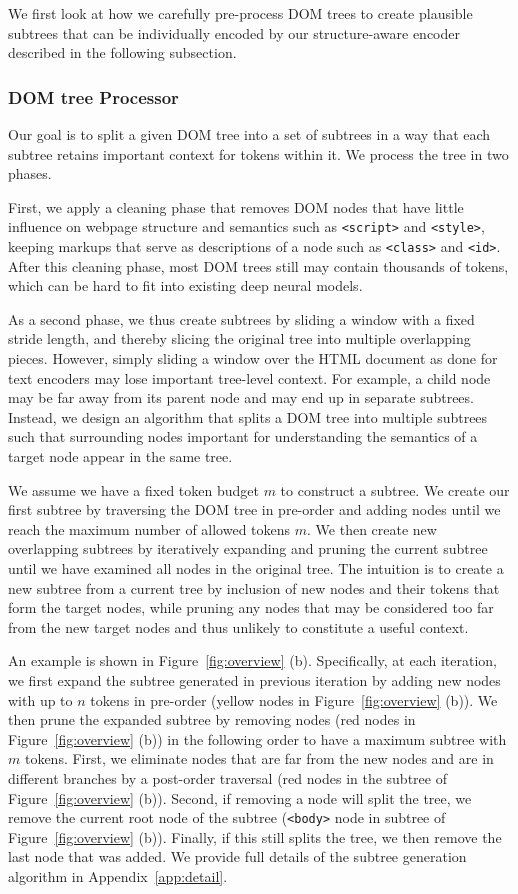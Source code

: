 \documentclass[sigconf, nonacm]{acmart}
\newcommand*\circled[1]{\tikz[baseline=(char.base)]{
            \node[shape=circle,draw,inner sep=1pt] (char) {#1};}}
\newcommand{\nop}[1]{}
\begin{document}
We first look at how we carefully pre-process DOM trees to create plausible subtrees that can be individually encoded by our structure-aware encoder described in the following subsection.
\subsubsection{DOM tree Processor}

Our goal is to split a given DOM tree into a set of subtrees in a way that each subtree retains important context for tokens within it. We process the tree in two phases. 

First, we apply a cleaning phase that removes DOM nodes that have little influence on webpage structure and semantics such as \texttt{<script>} and \texttt{<style>}, keeping markups that serve as descriptions of a node such as \texttt{<class>} and \texttt{<id>}. After this cleaning phase, most DOM trees still may contain thousands of tokens, which can be hard to fit into existing deep neural models. 

As a second phase, we thus create subtrees by sliding a window with a fixed stride length, and thereby slicing the original tree into multiple overlapping pieces. However, simply sliding a window over the HTML document as done for text encoders may lose important tree-level context. For example, a child node may be far away from its parent node and may end up in separate subtrees. Instead, we design an algorithm that splits a DOM tree into multiple subtrees such that surrounding nodes important for understanding the semantics of a target node appear in the same tree.

We assume we have a fixed token budget $m$ to construct a subtree. We create our first subtree by traversing the DOM tree in pre-order and adding nodes\nop{with a stride length of $n$} until we reach the maximum number of allowed tokens $m$. We then create new overlapping subtrees by iteratively expanding and pruning the current subtree until we have examined all nodes in the original tree. The intuition is to create a new subtree from a current tree by inclusion of new nodes and their tokens that form the target nodes, while pruning any nodes that may be considered too far from the new target nodes and thus unlikely to constitute a useful context.

An example is shown in Figure~\ref{fig:overview} (b). Specifically, at each iteration, we first expand the subtree generated in previous iteration by adding new nodes with up to $n$ tokens in pre-order (yellow nodes in Figure~\ref{fig:overview} (b)). We then prune the expanded subtree by removing nodes (red nodes in Figure~\ref{fig:overview} (b)) in the following order to have a maximum subtree with $m$ tokens. First, we eliminate nodes that are far from the new nodes and are in different branches by a post-order traversal  (red nodes in the subtree \circled{2} of Figure~\ref{fig:overview} (b)). Second, if removing a node will split the tree, we remove the current root node of the subtree (\texttt{<body>} node in subtree \circled{3} of Figure~\ref{fig:overview} (b)). Finally, if this still splits the tree, we then remove the last node that was added. We provide full details of the subtree generation algorithm in Appendix~\ref{app:detail}. 
\end{document}
